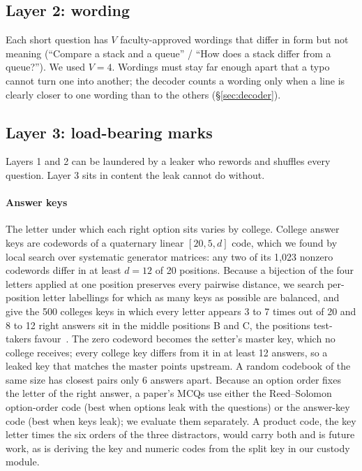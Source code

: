 \documentclass[10pt,a4paper]{article}
\theoremstyle{remark}
\begin{document}
\subsection{Layer 2: wording}
Each short question has $V$ faculty-approved wordings that differ in form but not meaning (\enquote{Compare a stack and a queue} / \enquote{How does a stack differ from a queue?}). We used $V=4$. Wordings must stay far enough apart that a typo cannot turn one into another; the decoder counts a wording only when a line is clearly closer to one wording than to the others (\S\ref{sec:decoder}).

\subsection{Layer 3: load-bearing marks}
\label{sec:tier3}
Layers 1 and 2 can be laundered by a leaker who rewords and shuffles every question. Layer 3 sits in content the leak cannot do without.

\paragraph{Answer keys} The letter under which each right option sits varies by college. College answer keys are codewords of a quaternary linear $[20,5,d]$ code, which we found by local search over systematic generator matrices: any two of its 1{,}023 nonzero codewords differ in at least $d=12$ of 20 positions. Because a bijection of the four letters applied at one position preserves every pairwise distance, we search per-position letter labellings for which as many keys as possible are balanced, and give the 500 colleges keys in which every letter appears 3 to 7 times out of 20 and 8 to 12 right answers sit in the middle positions B and C, the positions test-takers favour~\citep{attali2003}. The zero codeword becomes the setter's master key, which no college receives; every college key differs from it in at least 12 answers, so a leaked key that matches the master points upstream. A random codebook of the same size has closest pairs only 6 answers apart. Because an option order fixes the letter of the right answer, a paper's MCQs use either the Reed--Solomon option-order code (best when options leak with the questions) or the answer-key code (best when keys leak); we evaluate them separately. A product code, the key letter times the six orders of the three distractors, would carry both and is future work, as is deriving the key and numeric codes from the split key in our custody module.
\end{document}
